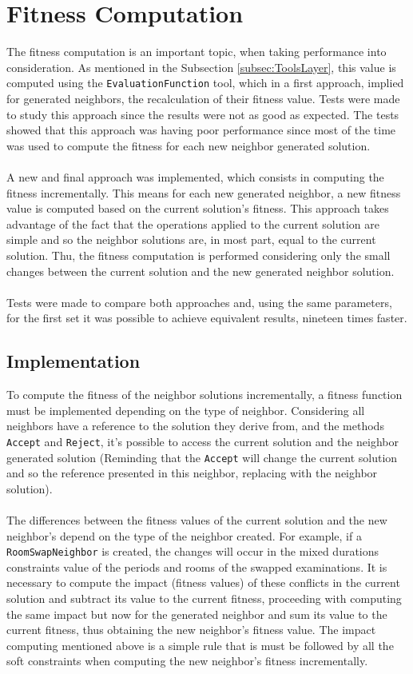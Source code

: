 \section{Fitness Computation}
\label{sec:FitnessComputation}

The fitness computation is an important topic, when taking performance into consideration. As mentioned in the Subsection \ref{subsec:ToolsLayer}, this value is computed using the \verb+EvaluationFunction+ tool, which in a first approach, implied for generated neighbors, the recalculation of their fitness value. Tests were made to study this approach since the results were not as good as expected. The tests showed that this approach was having poor performance since most of the time was used to compute the fitness for each new neighbor generated solution.\\
\\
A new and final approach was implemented, which consists in computing the fitness incrementally. This means for each new generated neighbor, a new fitness value is computed based on the current solution's fitness. This approach takes advantage of the fact that the operations applied to the current solution are simple and so the neighbor solutions are, in most part, equal to the current solution. Thu, the fitness computation is performed considering only the small changes between the current solution and the new generated neighbor solution.\\
\\
Tests were made to compare both approaches and, using the same parameters, for the first set it was possible to achieve equivalent results, nineteen times faster.

\subsection{Implementation}

To compute the fitness of the neighbor solutions incrementally, a fitness function must be implemented depending on the type of neighbor. Considering all neighbors have a reference to the solution they derive from, and the methods \verb+Accept+ and \verb+Reject+, it's possible to access the current solution and the neighbor generated solution (Reminding that the \verb+Accept+ will change the current solution and so the reference presented in this neighbor, replacing with the neighbor solution). \\
\\
The differences between the fitness values of the current solution and the new neighbor's depend on the type of the neighbor created. For example, if a \verb+RoomSwapNeighbor+ is created, the changes will occur in the mixed durations constraints value of the periods and rooms of the swapped examinations. It is necessary to compute the impact (fitness values) of these conflicts in the current solution and subtract its value to the current fitness, proceeding with computing the same impact but now for the generated neighbor and sum its value to the current fitness, thus obtaining the new neighbor's fitness value. The impact computing mentioned above is a simple rule that is must be followed by all the soft constraints when computing the new neighbor's fitness incrementally.